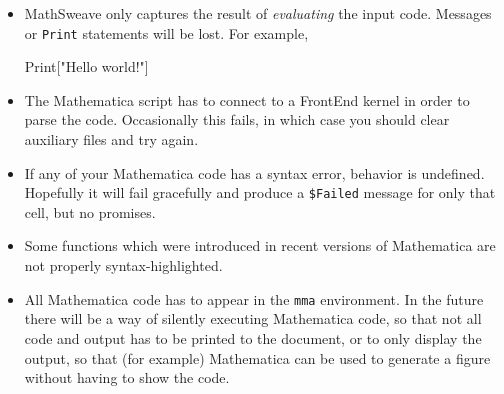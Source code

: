 \documentclass{article}
\begin{document}
\begin{itemize}
    \item MathSweave only captures the result of \emph{evaluating} the input code. Messages or \texttt{Print} statements will be lost. For example,
    \begin{mma}
        Print["Hello world!"]
    \end{mma}
    \item The Mathematica script has to connect to a FrontEnd kernel in order to parse the code. Occasionally this fails, in which case you should clear auxiliary files and try again.
    \item If any of your Mathematica code has a syntax error, behavior is undefined. Hopefully it will fail gracefully and produce a \texttt{\$Failed} message for only that cell, but no promises.
    \item Some functions which were introduced in recent versions of Mathematica are not properly syntax-highlighted.
    \item All Mathematica code has to appear in the \texttt{mma} environment. In the future there will be a way of silently executing Mathematica code, so that not all code and output has to be printed to the document, or to only display the output, so that (for example) Mathematica can be used to generate a figure without having to show the code.
\end{itemize}
\end{document}
